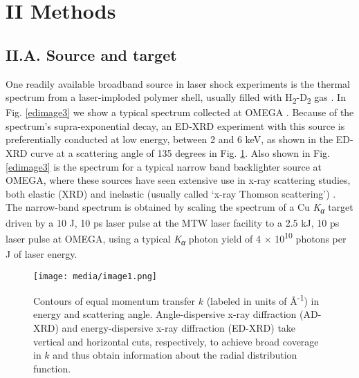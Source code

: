 \section{II Methods}\label{ii-methods}

\subsection{II.A. Source and target}

One readily available broadband source in laser shock experiments is the
thermal spectrum from a laser-imploded polymer shell, usually filled
with H\textsubscript{2}-D\textsubscript{2} gas
 \cite{maddox2011absolute, yaakobi2003extended}.
In Fig. \ref{edimage3} we show a typical spectrum collected at OMEGA
.
Because of the spectrum's supra-exponential decay, an ED-XRD experiment
with this source is preferentially conducted at low energy, between 2
and 6 keV, as shown in the ED-XRD curve at a scattering angle of 135
degrees in Fig. \ref{fig:ed1}. Also shown in Fig. \ref{edimage3} is the spectrum for a typical
narrow band backlighter source at OMEGA, where these sources have seen
extensive use in x-ray scattering studies, both elastic (XRD)
 \cite{ma2013x}
and inelastic (usually called `x-ray Thomson scattering')
 \cite{glenzer2009x}.
The narrow-band spectrum is obtained by scaling the spectrum of a Cu
\emph{K\textsubscript{α}} target driven by a 10 J, 10 ps laser pulse at
the MTW laser facility to a 2.5 kJ, 10 ps laser pulse at OMEGA, using a
typical \emph{K\textsubscript{α}} photon yield of 4 ×
10\textsuperscript{10} photons per J of laser energy. \cite{akli2007temperature}

\begin{figure}[h]
\caption{
Contours of equal momentum transfer \(k\) (labeled in units of
Å\textsuperscript{-1}) in energy and scattering angle. Angle-dispersive
x-ray diffraction (AD-XRD) and energy-dispersive x-ray diffraction
(ED-XRD) take vertical and horizontal cuts, respectively, to achieve
broad coverage in \(k\) and thus obtain information about the radial
distribution function.
}
\label{fig:ed1}
\centering
\texttt{[image: media/image1.png]}
\end{figure}

